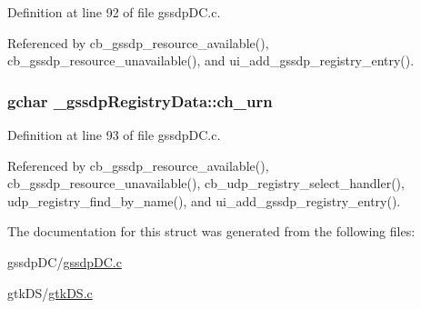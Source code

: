 Definition at line 92 of file gssdp\+D\+C.\+c.



Referenced by cb\+\_\+gssdp\+\_\+resource\+\_\+available(), cb\+\_\+gssdp\+\_\+resource\+\_\+unavailable(), and ui\+\_\+add\+\_\+gssdp\+\_\+registry\+\_\+entry().

\hypertarget{struct__gssdp_registry_data_a57a14b78092cbef8cf6dfa56cffa03db}{
\subsubsection[{ch\+\_\+urn}]{\setlength{\rightskip}{0pt plus 5cm}gchar \+\_\+gssdp\+Registry\+Data\+::ch\+\_\+urn}}\label{struct__gssdp_registry_data_a57a14b78092cbef8cf6dfa56cffa03db}


Definition at line 93 of file gssdp\+D\+C.\+c.



Referenced by cb\+\_\+gssdp\+\_\+resource\+\_\+available(), cb\+\_\+gssdp\+\_\+resource\+\_\+unavailable(), cb\+\_\+udp\+\_\+registry\+\_\+select\+\_\+handler(), udp\+\_\+registry\+\_\+find\+\_\+by\+\_\+name(), and ui\+\_\+add\+\_\+gssdp\+\_\+registry\+\_\+entry().



The documentation for this struct was generated from the following files\+:\begin{DoxyCompactItemize}
\item 
gssdp\+D\+C/\hyperlink{gssdp_d_c_8c}{gssdp\+D\+C.\+c}\item 
gtk\+D\+S/\hyperlink{gtk_d_s_8c}{gtk\+D\+S.\+c}\end{DoxyCompactItemize}
